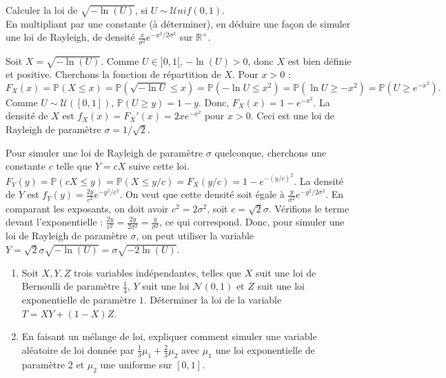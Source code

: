 \documentclass[solutions]{exercices}
\begin{document}
\begin{exercice}
Calculer la loi de $\sqrt{-\ln(U)}$, si $U\sim \mathcal{U}nif(0,1)$.\\
En multipliant par une constante (à déterminer), en déduire une façon de simuler une loi de Rayleigh, de densité
$\frac{x}{\sigma^2}e^{-x^2/2\sigma^2}$
sur $\mathbb{R}^+$.
\end{exercice}

\begin{solution}
Soit $X = \sqrt{-\ln(U)}$. Comme $U \in ]0,1[$, $-\ln(U) > 0$, donc $X$ est bien définie et positive.
Cherchons la fonction de répartition de $X$. Pour $x>0$ :
\[ F_X(x) = \mathbb{P}(X \le x) = \mathbb{P}(\sqrt{-\ln U} \le x) = \mathbb{P}(-\ln U \le x^2) = \mathbb{P}(\ln U \ge -x^2) = \mathbb{P}(U \ge e^{-x^2}). \]
Comme $U \sim \mathcal{U}([0,1])$, $\mathbb{P}(U \ge y) = 1-y$. Donc, $F_X(x) = 1 - e^{-x^2}$.
La densité de $X$ est $f_X(x) = F_X'(x) = 2xe^{-x^2}$ pour $x>0$.
Ceci est une loi de Rayleigh de paramètre $\sigma = 1/\sqrt{2}$.

Pour simuler une loi de Rayleigh de paramètre $\sigma$ quelconque, cherchons une constante $c$ telle que $Y=cX$ suive cette loi.
$F_Y(y) = \mathbb{P}(cX \le y) = \mathbb{P}(X \le y/c) = F_X(y/c) = 1 - e^{-(y/c)^2}$.
La densité de $Y$ est $f_Y(y) = \frac{2y}{c^2} e^{-y^2/c^2}$.
On veut que cette densité soit égale à $\frac{y}{\sigma^2}e^{-y^2/2\sigma^2}$.
En comparant les exposants, on doit avoir $c^2 = 2\sigma^2$, soit $c=\sqrt{2}\sigma$.
Vérifions le terme devant l'exponentielle : $\frac{2y}{c^2} = \frac{2y}{2\sigma^2} = \frac{y}{\sigma^2}$, ce qui correspond.
Donc, pour simuler une loi de Rayleigh de paramètre $\sigma$, on peut utiliser la variable $Y = \sqrt{2}\sigma \sqrt{-\ln(U)} = \sigma \sqrt{-2\ln(U)}$.
\end{solution}

\begin{exercice}
\begin{enumerate}
  \item Soit $X,Y,Z$ trois variables indépendantes, telles que $X$ suit une loi de Bernoulli de paramètre $\frac{1}{4}$, $Y$ suit une loi $\mathcal{N}(0,1)$ et $Z$ suit une loi exponentielle de paramètre $1$. Déterminer la loi de la variable $T = X Y + (1-X) Z$.
  \item En faisant un mélange de loi, expliquer comment simuler une variable aléatoire de loi donnée par
$\frac{1}{3}\mu_1+\frac{2}{3}\mu_2$ avec $\mu_1$ une loi exponentielle de paramètre 2 et $\mu_2$ une uniforme sur $[0,1]$.
\end{enumerate}

\end{exercice}
\end{document}
